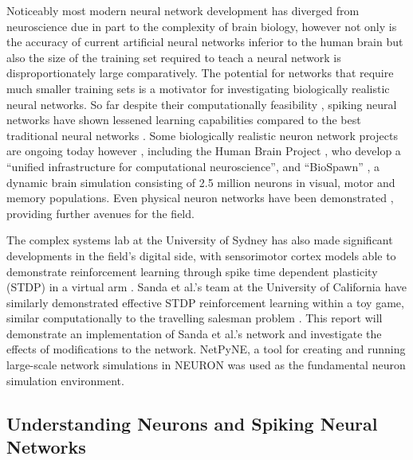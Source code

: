\documentclass[11pt, twocolumn]{article}
\begin{document}
Noticeably most modern neural network development has diverged from neuroscience due in part to the complexity of brain biology, however not only is the accuracy of current artificial neural networks inferior to the human brain but also the size of the training set required to teach a neural network is disproportionately large comparatively. The potential for networks that require much smaller training sets is a motivator for investigating biologically realistic neural networks. So far despite their computationally feasibility \cite{zenke2014limits}, spiking neural networks have shown lessened learning capabilities compared to the best traditional neural networks \cite{schmidhuber2015deep}. Some biologically realistic neuron network projects are ongoing today however \cite{ashby2011tutorial}\cite{ashby2005frost}\cite{frank2005dynamic}\cite{hartley2006understanding}\cite{leveille2010running}, including the Human Brain Project \cite{markram2015reconstruction}, who develop a ``unified infrastructure for computational neuroscience'', and ``BioSpawn'' \cite{eliasmith2016biospaun}, a dynamic brain simulation consisting of 2.5 million neurons in visual, motor and memory populations. Even physical neuron networks have been demonstrated \cite{frega2014network}, providing further avenues for the field.

The complex systems lab at the University of Sydney has also made significant developments in the field's digital side, with sensorimotor cortex models able to demonstrate reinforcement learning through spike time dependent plasticity (\acs{STDP}) in a virtual arm \cite{neymotin2013reinforcement}\cite{dura2017evolutionary}. Sanda et al.'s team at the University of California have similarly demonstrated effective \acs{STDP} reinforcement learning within a toy game, similar computationally to the travelling salesman problem \cite{sanda2017multi}. This report will demonstrate an implementation of Sanda et al.'s network and investigate the effects of modifications to the network. \acs{NetPyNE}, a tool for creating and running large-scale network simulations in \acs{NEURON} \cite{dura2018netpyne} was used as the fundamental neuron simulation environment.

\subsection*{Understanding Neurons and Spiking Neural Networks}
\end{document}

